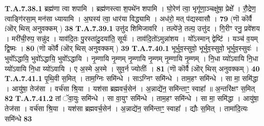 \documentclass[17pt]{extarticle}
\begin{document}
{                                \textbf{ T.A.7.38.1} \newline
                  ब्रह्म॑णा त्वा शपामि । ब्रह्म॑णस्त्वा श॒पथे॑न शपामि । घो॒रेण॑ त्वा॒ भृगू॑णा॒ञ्चक्षु॑षा॒ प्रेक्षे᳚ । रौ॒द्रेण॒ त्वाङ्गि॑रसा॒म् मन॑सा ध्यायामि ।  अ॒घस्य॑ त्वा॒ धार॑या विद्ध्यामि ।  अध॑रो॒ मत् प॑द्यस्वासौ । \textbf{ 79} \newline
                  \newline
                                                        (णॊ कॊर्वै fऒर् थिस् अनुवक्कम् ) \textbf{38} \newline \newline
                                \textbf{ T.A.7.39.1} \newline
                  उत्तु॑द शिमिजावरि । तल्पे॑जे॒ तल्प॒ उत्तु॑द । गि॒रीꣳ रनु॒ प्रवे॑शय । मरी॑ची॒रुप॒ सन्नु॑द । याव॑दि॒तः पु॒रस्ता॑दु॒दया॑ति॒ सूर्यः॑ ।  ताव॑दि॒तो॑ऽमुन्ना॑शय । यो᳚ऽस्मान् द्वेष्टि॑ ।  यञ्च॑ व॒यम् द्वि॒ष्मः । \textbf{ 80} \newline
                  \newline
                                                        (णॊ कॊर्वै fऒर् थिस् अनुवक्कम् ) \textbf{39} \newline \newline
                                \textbf{ T.A.7.40.1} \newline
                  भूर्भुव॒स्सुवो॒ भूर्भुव॒स्सुवो॒ भूर्भुव॒स्सुवः॑ ।  भुवो᳚ऽद्धायि॒ भुवो᳚ऽद्धायि॒ भुवो᳚ऽद्धायि ।  नृ॒म्णायि नृ॒म्णम् नृ॒म्णायि नृ॒म्णम् नृ॒म्णायि नृ॒म्णम् । नि॒धा य्यो॑ऽवायि नि॒धा य्यो॑ऽवायि नि॒धा य्यो॑ऽवायि । ए अ॒स्मे अ॒स्मे । सुव॒र्न ज्योतीः᳚ । \textbf{ 81} \newline
                  \newline
                                                        (णॊ कॊर्वै fऒर् थिस् अनुवक्कम् ) \textbf{40} \newline \newline
                                \textbf{ T.A.7.41.1} \newline
                  पृ॒थि॒वी स॒मित् । ताम॒ग्निः समि॑न्धे । साऽग्निꣳ समि॑न्धे । ताम॒हꣳ समि॑न्धे । सा मा॒ समि॑द्धा । आयु॑षा॒ तेज॑सा । वर्च॑सा श्रि॒या । यश॑सा ब्रह्मवर्च॒सेन॑ । अ॒न्नाद्ये॑न॒ समि॑न्ताꣳ॒॒ स्वाहा᳚ ॥  अ॒न्तरि॑क्षꣳ स॒मित् \textbf{ 82} \newline
                  \newline
                                                                  \textbf{ T.A.7.41.2} \newline
                  तां ॅवा॒युः समि॑न्धे । सा वा॒युꣳ समि॑न्धे । ताम॒हꣳ समि॑न्धे । सा मा॒ समि॑द्धा । आयु॑षा॒ तेज॑सा । वर्च॑सा श्रि॒या । यश॑सा ब्रह्मवर्च॒सेन॑ । अ॒न्नाद्ये॑न॒ समि॑न्ताꣳ॒॒ स्वाहा᳚ ।  द्यौः स॒मित् । तामा॑दि॒त्यः समि॑न्धे \textbf{ 83} \newline
}
\end{document}
